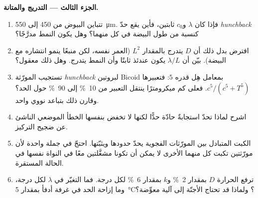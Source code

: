 \begin{problem}
\medskip
\noindent\textbf{الجزء الثالث --- التدريج والمتانة.}
\begin{enumerate}[resume]
  \item تتباين البيوض من \qty{450}{} إلى \qty{550}{\micro m}.
        فإذا كان $\lambda$ و$c_{0}$ ثابتين، فأين يقع حدّ
        \emph{hunchback} كنسبة من طول البيضة في كل منهما؟ وهل
        يكون النمط مدرَّجًا؟
  \item افترض بدل ذلك أن $D$ يتدرج بالمقدار $L^{2}$ (العمر نفسه،
        لكن منبعًا ينمو انتشاره مع البيضة). بيّن أن
        $\lambda/L$ يكون عندئذ ثابتًا وأن النمط يتدرج. وهل
        ذلك معقول؟
  \item تستجيب المورّثة \emph{hunchback} لبروتين Bicoid بمعامل هِل
        قدره $5$: فتعبيرها $c^{5}/(c^{5} + T^{5})$. فعلى كم
        ميكرومترًا ينتقل التعبير من \qty{10}{\%} إلى
        \qty{90}{\%} حول الحد؟ وقارن ذلك بتباعد نووي واحد.
  \item اشرح لماذا تحدّ استجابةٌ حادّة حدًّا لكنها لا تخفض
        بنفسها الخطأ الموضعي الناشئ عن ضجيج التركيز.
  \item الكبت المتبادل بين المورّثات الفجوية يحدّ حدودها
        ويثبّتها. احتجّ في جملة واحدة لأن مورّثتين تكبت كل
        منهما الأخرى لا يمكن أن تكونا مشغَّلتين معًا في
        النواة نفسها في الحالة المستقرة.
  \item ترفع الحرارة $D$ بمقدار \qty{2}{\%} و$k$ بمقدار
        \qty{6}{\%} لكل درجة. فما التغيّر في $\lambda$ لكل
        درجة، وما إزاحة الحد في غرفة أدفأ بمقدار \qty{5}{\celsius}؟
        ولماذا قد تحتاج الأجنّة إلى آلية معوِّضة؟
\end{enumerate}


\end{problem}
